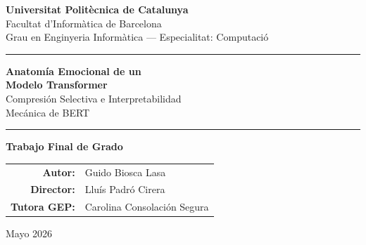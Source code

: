 \documentclass[11pt, a4paper]{article}
\begin{document}
\begin{titlepage}
    \centering
    \vspace*{1.5cm}


    {\Large\textbf{Universitat Politècnica de Catalunya}}\\[0.2cm]
    {\large Facultat d'Informàtica de Barcelona}\\[0.15cm]
    {\normalsize Grau en Enginyeria Informàtica --- Especialitat: Computació}

    \vspace{2cm}

    \rule{0.8\textwidth}{0.5pt}
    \vspace{0.6cm}

    {\LARGE\bfseries Anatomía Emocional de un\\[0.3em]
    Modelo Transformer}\\[0.6em]
    {\Large Compresión Selectiva e Interpretabilidad\\[0.2em]
    Mecánica de BERT}

    \vspace{0.6cm}
    \rule{0.8\textwidth}{0.5pt}

    \vspace{1cm}

    {\large\textbf{Trabajo Final de Grado}}

    \vfill

    \begin{tabular}{rl}
        \textbf{Autor:}     & Guido Biosca Lasa \\[0.3cm]
        \textbf{Director:}  & Lluís Padró Cirera \\[0.3cm]
        \textbf{Tutora GEP:} & Carolina Consolación Segura \\
    \end{tabular}

    \vspace{2cm}
    {\large Mayo 2026}
    \vspace{1cm}
\end{titlepage}

\newpage
\thispagestyle{plain}
\end{document}
